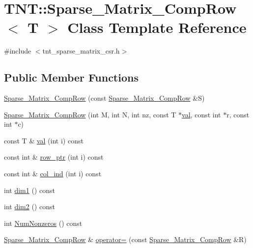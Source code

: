 \hypertarget{classTNT_1_1Sparse__Matrix__CompRow}{\section{T\-N\-T\-:\-:Sparse\-\_\-\-Matrix\-\_\-\-Comp\-Row$<$ T $>$ Class Template Reference}
\label{classTNT_1_1Sparse__Matrix__CompRow}
}


{\ttfamily \#include $<$tnt\-\_\-sparse\-\_\-matrix\-\_\-csr.\-h$>$}

\subsection*{Public Member Functions}
\begin{DoxyCompactItemize}
\item 
\hyperlink{classTNT_1_1Sparse__Matrix__CompRow_a24b7988458326cb9456df781dd4c9026}{Sparse\-\_\-\-Matrix\-\_\-\-Comp\-Row} (const \hyperlink{classTNT_1_1Sparse__Matrix__CompRow}{Sparse\-\_\-\-Matrix\-\_\-\-Comp\-Row} \&S)
\item 
\hyperlink{classTNT_1_1Sparse__Matrix__CompRow_ae911b3218edf46dea77f493f8736c6f0}{Sparse\-\_\-\-Matrix\-\_\-\-Comp\-Row} (int M, int N, int nz, const T $\ast$\hyperlink{classTNT_1_1Sparse__Matrix__CompRow_a42e81a5b189129ce63664dbaa1d61621}{val}, const int $\ast$r, const int $\ast$c)
\item 
const T \& \hyperlink{classTNT_1_1Sparse__Matrix__CompRow_a42e81a5b189129ce63664dbaa1d61621}{val} (int i) const 
\item 
const int \& \hyperlink{classTNT_1_1Sparse__Matrix__CompRow_ada54cd9eb6533abaf14aeaabeb91d722}{row\-\_\-ptr} (int i) const 
\item 
const int \& \hyperlink{classTNT_1_1Sparse__Matrix__CompRow_a3dc66f15b5e377e964c88d5f82e6470e}{col\-\_\-ind} (int i) const 
\item 
int \hyperlink{classTNT_1_1Sparse__Matrix__CompRow_a7646a8a823ca70d36054f5cd844e81b5}{dim1} () const 
\item 
int \hyperlink{classTNT_1_1Sparse__Matrix__CompRow_a2b5b9183804613137e036e709c5d2d62}{dim2} () const 
\item 
int \hyperlink{classTNT_1_1Sparse__Matrix__CompRow_ad55f2c30dc3f06e73649313b0b4fd2df}{Num\-Nonzeros} () const 
\item 
\hyperlink{classTNT_1_1Sparse__Matrix__CompRow}{Sparse\-\_\-\-Matrix\-\_\-\-Comp\-Row} \& \hyperlink{classTNT_1_1Sparse__Matrix__CompRow_a6798ccb062c8aa59bf694e235e74f00b}{operator=} (const \hyperlink{classTNT_1_1Sparse__Matrix__CompRow}{Sparse\-\_\-\-Matrix\-\_\-\-Comp\-Row} \&R)
\end{DoxyCompactItemize}



